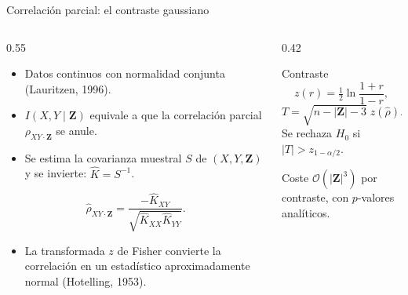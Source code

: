 \documentclass[aspectratio=169,11pt]{beamer}
\newcommand{\srccite}[1]{{\scriptsize\color{upmgray}(#1)}}
\begin{document}
\begin{frame}[t]{Correlación parcial: el contraste gaussiano}
  \begin{columns}[T,onlytextwidth]
    \begin{column}{0.55\textwidth}
      \begin{itemize}
        \item Datos continuos con normalidad conjunta
              \srccite{Lauritzen, 1996}.
        \item $I(X,Y\mid\mathbf Z)$ equivale a que la correlación parcial
              $\rho_{XY\cdot\mathbf Z}$ se anule.
        \item Se estima la covarianza muestral $S$ de $(X,Y,\mathbf Z)$ y se
              invierte: $\hat K=S^{-1}$.
      \end{itemize}
      \[
        \hat\rho_{XY\cdot\mathbf Z}
        =\frac{-\hat K_{XY}}{\sqrt{\hat K_{XX}\hat K_{YY}}}.
      \]
      \begin{itemize}
        \item La transformada $z$ de Fisher convierte la correlación en un
              estadístico aproximadamente normal \srccite{Hotelling, 1953}.
      \end{itemize}
    \end{column}
    \begin{column}{0.42\textwidth}
      \begin{block}{Contraste}
        \[
          z(r)=\tfrac12\ln\frac{1+r}{1-r},
        \]
        \[
          T=\sqrt{n-|\mathbf Z|-3}\;z(\hat\rho).
        \]
        Se rechaza $H_0$ si $|T|>z_{1-\alpha/2}$.
      \end{block}
      \begin{exampleblock}{Coste}
        $\mathcal O(|\mathbf Z|^3)$ por contraste, con $p$-valores
        analíticos.
      \end{exampleblock}
    \end{column}
  \end{columns}
\end{frame}
\end{document}
